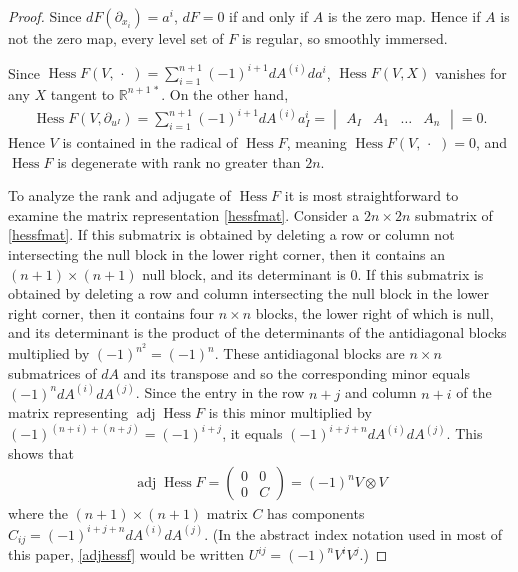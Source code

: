 \documentclass [leqno, 10pt]{amsart}
\theoremstyle{definition}
\numberwithin{equation}{section}
\newcommand{\hess}{\operatorname{Hess}}
\newcommand{\adj}{\operatorname{adj}}
\newcommand{\dum}{\,\cdot\,\,}
\newcommand{\pr}{\partial}
\newcommand{\tensor}{\otimes}
\newcommand{\rea}{\mathbb R}
\begin{document}
\begin{proof}
Since $dF(\pr_{x_{i}}) = a^{i}$, $dF = 0$ if and only if $A$ is the zero map. Hence if $A$ is not the zero map, every level set of $F$ is regular, so smoothly immersed.

Since $\hess F(V, \dum) = \sum_{i = 1}^{n+1}(-1)^{i+1}dA^{(i)}da^{i}$, $\hess F(V, X)$ vanishes for any $X$ tangent to $\rea^{n+1\,\ast}$. On the other hand,
\begin{align}
\hess F(V, \pr_{u^{I}}) = \sum_{i = 1}^{n+1}(-1)^{i+1}dA^{(i)}a^{i}_{I} = \begin{vmatrix} A_{I} & A_{1} & \dots & A_{n} \end{vmatrix} = 0.
\end{align}
Hence  $V$ is contained in the radical of $\hess F$, meaning $\hess F(V, \dum) = 0$, and $\hess F$ is degenerate with rank no greater than $2n$.
 
To analyze the rank and adjugate of $\hess F$ it is most straightforward to examine the matrix representation \eqref{hessfmat}. Consider a $2n \times 2n$ submatrix of \eqref{hessfmat}. If this submatrix is obtained by deleting a row or column not intersecting the null block in the lower right corner, then it contains an $(n+1) \times (n+1)$ null block, and its determinant is $0$. If this submatrix is obtained by deleting a row and column intersecting the null block in the lower right corner, then it contains four $n \times n$ blocks, the lower right of which is null, and its determinant is  the product of the determinants of the antidiagonal blocks multiplied by $(-1)^{n^{2}} = (-1)^{n}$. These antidiagonal blocks are $n \times n$ submatrices of $dA$ and its transpose and so the corresponding minor equals $(-1)^{n}dA^{(i)}dA^{(j)}$. Since the entry in the row $n+j$ and column $n+i$ of the matrix representing $\adj \hess F$ is this minor multiplied by $(-1)^{(n+i)+ (n+j)} = (-1)^{i+j}$, it equals $(-1)^{i+j+n}dA^{(i)}dA^{(j)}$. This shows that 
\begin{align}\label{adjhessf}
\adj \hess F = \begin{pmatrix}
0 & 0 \\ 
0 & C
\end{pmatrix} = (-1)^{n}V \tensor V 
\end{align}
where the $(n+1)\times (n+1)$ matrix $C$ has components $C_{ij} = (-1)^{i+j+n}dA^{(i)}dA^{(j)}$. 
(In the abstract index notation used in most of this paper, \eqref{adjhessf} would be written $U^{ij} = (-1)^{n}V^{i}V^{j}$.) 


\end{proof}
\end{document}
